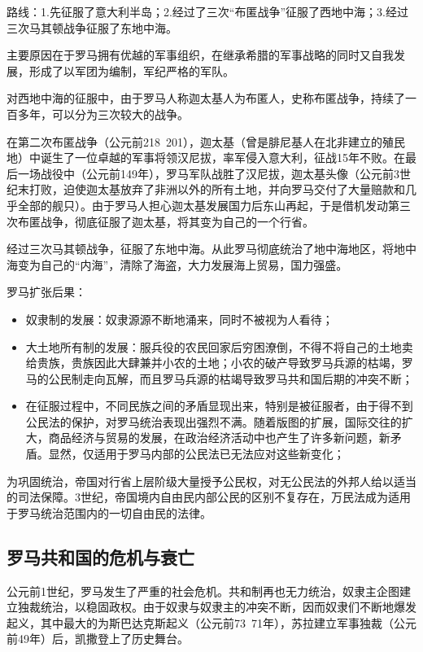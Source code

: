路线：1.先征服了意大利半岛；2.经过了三次“布匿战争”征服了西地中海；3.经过三次马其顿战争征服了东地中海。

主要原因在于罗马拥有优越的军事组织，在继承希腊的军事战略的同时又自我发展，形成了以军团为编制，军纪严格的军队。

对西地中海的征服中，由于罗马人称迦太基人为布匿人，史称布匿战争，持续了一百多年，可以分为三次较大的战争。

在第二次布匿战争（公元前218~201），迦太基（曾是腓尼基人在北非建立的殖民地）中诞生了一位卓越的军事将领汉尼拔，率军侵入意大利，征战15年不败。在最后一场战役中（公元前149年），罗马军队战胜了汉尼拔，迦太基头像（公元前3世纪末打败，迫使迦太基放弃了非洲以外的所有土地，并向罗马交付了大量赔款和几乎全部的舰只）。由于罗马人担心迦太基发展国力后东山再起，于是借机发动第三次布匿战争，彻底征服了迦太基，将其变为自己的一个行省。

经过三次马其顿战争，征服了东地中海。从此罗马彻底统治了地中海地区，将地中海变为自己的“内海”，清除了海盗，大力发展海上贸易，国力强盛。

罗马扩张后果：
\begin{itemize}
    \item 奴隶制的发展：奴隶源源不断地涌来，同时不被视为人看待；
    \item 大土地所有制的发展：服兵役的农民回家后穷困潦倒，不得不将自己的土地卖给贵族，贵族因此大肆兼并小农的土地；小农的破产导致罗马兵源的枯竭，罗马的公民制走向瓦解，而且罗马兵源的枯竭导致罗马共和国后期的冲突不断；
    \item 在征服过程中，不同民族之间的矛盾显现出来，特别是被征服者，由于得不到公民法的保护，对罗马统治表现出强烈不满。随着版图的扩展，国际交往的扩大，商品经济与贸易的发展，在政治经济活动中也产生了许多新问题，新矛盾。显然，仅适用于罗马内部的公民法已无法应对这些新变化；
\end{itemize}

为巩固统治，帝国对行省上层阶级大量授予公民权，对无公民法的外邦人给以适当的司法保障。3世纪，帝国境内自由民内部公民的区别不复存在，万民法成为适用于罗马统治范围内的一切自由民的法律。

\subsection{罗马共和国的危机与衰亡}

公元前1世纪，罗马发生了严重的社会危机。共和制再也无力统治，奴隶主企图建立独裁统治，以稳固政权。由于奴隶与奴隶主的冲突不断，因而奴隶们不断地爆发起义，其中最大的为斯巴达克斯起义（公元前73~71年），苏拉建立军事独裁（公元前49年）后，凯撒登上了历史舞台。

